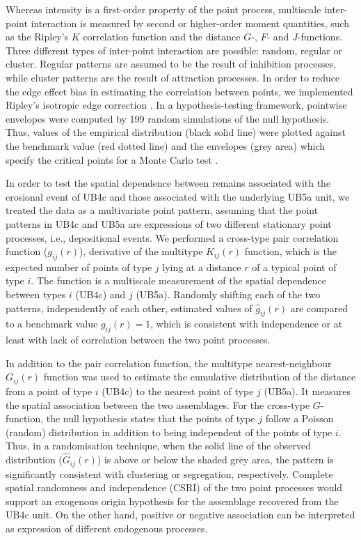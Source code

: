 \documentclass[review,authoryear,times]{elsarticle} %
\begin{document}
Whereas intensity is a first-order property of the point process, multiscale inter-point interaction is measured by second or higher-order moment quantities, such as the Ripley's $K$ correlation function \citep{Ripley1976,Ripley1977} and the distance $G$-, $F$- and $J$-functions. Three different types of inter-point interaction are possible: random, regular or cluster. Regular patterns are assumed to be the result of inhibition processes, while cluster patterns are the result of attraction processes. In order to reduce the edge effect bias in estimating the correlation between points, we implemented Ripley's isotropic edge correction \citep{Ohser1983,Ripley1988}. In a hypothesis-testing framework, pointwise envelopes were computed by 199 random simulations of the null hypothesis. Thus, values of the empirical distribution (black solid line) were plotted against the benchmark value (red dotted line) and the envelopes (grey area) which specify the critical points for a Monte Carlo test \citep{Ripley1981}.

In order to test the spatial dependence between remains associated with the erosional event of UB4c and those associated with the underlying UB5a unit, we treated the data as a multivariate point pattern, assuming that the point patterns in UB4c and UB5a are expressions of two different stationary point processes, i.e., depositional events. We performed a cross-type pair correlation function ($g_{ij}(r)$), derivative of the multitype $K_{ij}(r)$ function, which is the expected number of points of type $j$ lying at a distance $r$ of a typical point of type $i$. The function is a multiscale measurement of the spatial dependence between types $i$ (UB4c) and $j$ (UB5a). Randomly shifting each of the two patterns, independently of each other, estimated values of $\hat{g}_{ij}(r)$ are compared to a benchmark value $g_{ij}(r)=1$, which is consistent with independence or at least with lack of correlation between the two point processes.

In addition to the pair correlation function, the multitype nearest-neighbour $G_{ij}(r)$ function was used to estimate the cumulative distribution of the distance from a point of type $i$ (UB4c) to the nearest point of type $j$ (UB5a). It measures the spatial association between the two assemblages. For the cross-type $G$-function, the null hypothesis states that the points of type $j$ follow a Poisson (random) distribution in addition to being independent of the points of type $i$. Thus, in a randomisation technique, when the solid line of the observed distribution ($\hat{G}_{ij}(r)$) is above or below the shaded grey area, the pattern is significantly consistent with clustering or segregation, respectively. Complete spatial randomness and independence (CSRI) of the two point processes would support an exogenous origin hypothesis for the assemblage recovered from the UB4c unit. On the other hand, positive or negative association can be interpreted as expression of different endogenous processes.
\end{document}
